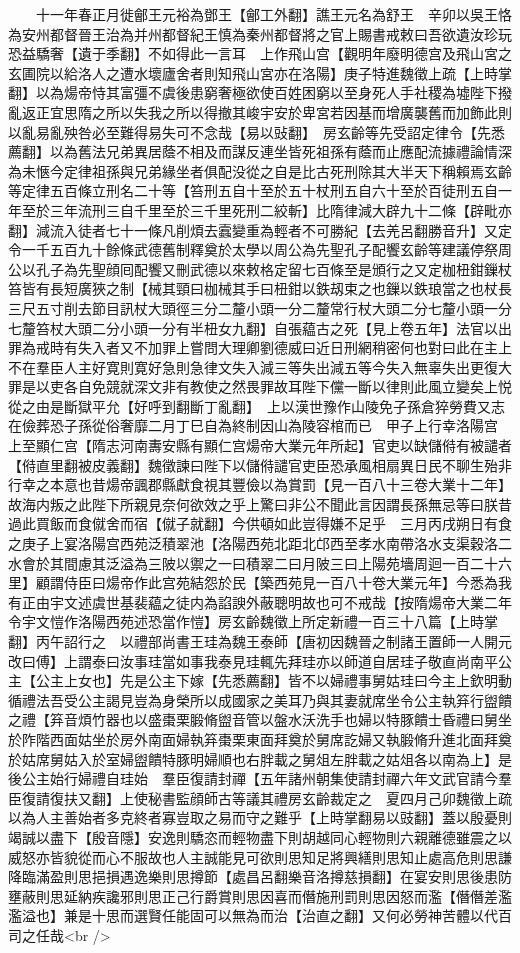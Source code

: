 　　十一年春正月徙鄶王元裕為鄧王【鄶工外翻】譙王元名為舒王　辛卯以吳王恪為安州都督晉王治為并州都督紀王慎為秦州都督將之官上賜書戒敕曰吾欲遺汝珍玩恐益驕奢【遺于季翻】不如得此一言耳　上作飛山宫【觀明年廢明德宫及飛山宮之玄圃院以給洛人之遭水壞廬舍者則知飛山宮亦在洛陽】庚子特進魏徵上疏【上時掌翻】以為煬帝恃其富彊不虞後患窮奢極欲使百姓困窮以至身死人手社稷為墟陛下撥亂返正宜思隋之所以失我之所以得撤其峻宇安於卑宮若因基而增廣襲舊而加飾此則以亂易亂殃咎必至難得易失可不念哉【易以䜴翻】　房玄齡等先受詔定律令【先悉薦翻】以為舊法兄弟異居蔭不相及而謀反連坐皆死祖孫有蔭而止應配流據禮論情深為未愜今定律祖孫與兄弟緣坐者俱配没從之自是比古死刑除其大半天下稱賴焉玄齡等定律五百條立刑名二十等【笞刑五自十至於五十杖刑五自六十至於百徒刑五自一年至於三年流刑三自千里至於三千里死刑二絞斬】比隋律減大辟九十二條【辟毗亦翻】減流入徒者七十一條凡削煩去蠧變重為輕者不可勝紀【去羌呂翻勝音升】又定令一千五百九十餘條武德舊制釋奠於太學以周公為先聖孔子配饗玄齡等建議停祭周公以孔子為先聖顔囘配饗又刪武德以來敕格定留七百條至是頒行之又定枷杻鉗鏁杖笞皆有長短廣狹之制【械其頸曰枷械其手曰杻鉗以鉄刼束之也鏁以鉄琅當之也杖長三尺五寸削去節目訊杖大頭徑三分二釐小頭一分二釐常行杖大頭二分七釐小頭一分七釐笞杖大頭二分小頭一分有半杻女九翻】自張藴古之死【見上卷五年】法官以出罪為戒時有失入者又不加罪上嘗問大理卿劉德威曰近日刑網稍密何也對曰此在主上不在羣臣人主好寛則寛好急則急律文失入減三等失出減五等今失入無辜失出更復大罪是以吏各自免競就深文非有教使之然畏罪故耳陛下儻一斷以律則此風立變矣上悦從之由是斷獄平允【好呼到翻斷丁亂翻】　上以漢世豫作山陵免子孫倉猝勞費又志在儉葬恐子孫從俗奢靡二月丁巳自為終制因山為陵容棺而已　甲子上行幸洛陽宫　上至顯仁宫【隋志河南夀安縣有顯仁宫煬帝大業元年所起】官吏以缺儲偫有被譴者【偫直里翻被皮義翻】魏徵諫曰陛下以儲偫譴官吏臣恐承風相扇異日民不聊生殆非行幸之本意也昔煬帝諷郡縣獻食視其豐儉以為賞罰【見一百八十三卷大業十二年】故海内叛之此陛下所親見奈何欲效之乎上驚曰非公不聞此言因謂長孫無忌等曰朕昔過此買飯而食僦舍而宿【僦子就翻】今供頓如此豈得嫌不足乎　三月丙戌朔日有食之庚子上宴洛陽宫西苑泛積翠池【洛陽西苑北距北邙西至孝水南帶洛水支渠穀洛二水會於其間慮其泛溢為三陂以禦之一曰積翠二曰月陂三曰上陽苑墻周迴一百二十六里】顧謂侍臣曰煬帝作此宫苑結怨於民【築西苑見一百八十卷大業元年】今悉為我有正由宇文述虞世基裴藴之徒内為諂諛外蔽聰明故也可不戒哉【按隋煬帝大業二年令宇文愷作洛陽西苑述恐當作愷】房玄齡魏徵上所定新禮一百三十八篇【上時掌翻】丙午詔行之　以禮部尚書王珪為魏王泰師【唐初因魏晉之制諸王置師一人開元改曰傅】上謂泰曰汝事珪當如事我泰見珪輒先拜珪亦以師道自居珪子敬直尚南平公主【公主上女也】先是公主下嫁【先悉薦翻】皆不以婦禮事舅姑珪曰今主上欽明動循禮法吾受公主謁見豈為身榮所以成國家之美耳乃與其妻就席坐令公主執笲行盥饋之禮【笲音煩竹器也以盛棗栗腶脩盥音管以盤水沃洗手也婦以特豚饋士昏禮曰舅坐於阼階西面姑坐於房外南面婦執笲棗栗東面拜奠於舅席訖婦又執腶脩升進北面拜奠於姑席舅姑入於室婦盥饋特豚明婦順也右胖載之舅俎左胖載之姑俎各以南為上】是後公主始行婦禮自珪始　羣臣復請封禪【五年諸州朝集使請封禪六年文武官請今羣臣復請復扶又翻】上使秘書監顔師古等議其禮房玄齡裁定之　夏四月己卯魏徵上疏以為人主善始者多克終者寡豈取之易而守之難乎【上時掌翻易以豉翻】蓋以殷憂則竭誠以盡下【殷音隱】安逸則驕恣而輕物盡下則胡越同心輕物則六親離德雖震之以威怒亦皆貌從而心不服故也人主誠能見可欲則思知足將興繕則思知止處高危則思謙降臨滿盈則思挹損遇逸樂則思撙節【處昌呂翻樂音洛撙慈損翻】在宴安則思後患防壅蔽則思延納疾讒邪則思正己行爵賞則思因喜而僭施刑罰則思因怒而濫【僭僭差濫濫溢也】兼是十思而選賢任能固可以無為而治【治直之翻】又何必勞神苦體以代百司之任哉<br />
